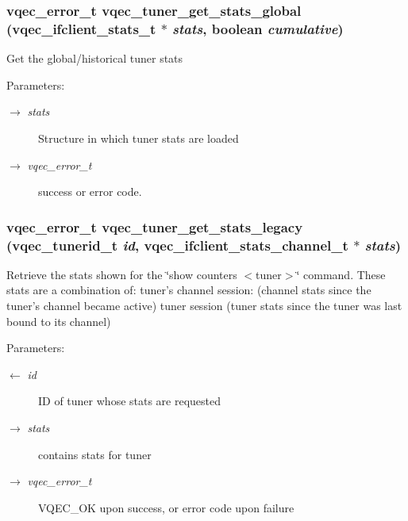 \subsubsection{\setlength{\rightskip}{0pt plus 5cm}vqec\_\-error\_\-t vqec\_\-tuner\_\-get\_\-stats\_\-global (\bf{vqec\_\-ifclient\_\-stats\_\-t} $\ast$ {\em stats}, boolean {\em cumulative})}\label{vqec__tuner_8c_8c7bede0f83da6759d2cf511c4d389fd}


Get the global/historical tuner stats

\begin{Desc}
\item[Parameters:]
\begin{description}
\item[\mbox{$\rightarrow$} {\em stats}]Structure in which tuner stats are loaded \item[\mbox{$\rightarrow$} {\em vqec\_\-error\_\-t}]success or error code. \end{description}
\end{Desc}
\subsubsection{\setlength{\rightskip}{0pt plus 5cm}vqec\_\-error\_\-t vqec\_\-tuner\_\-get\_\-stats\_\-legacy (vqec\_\-tunerid\_\-t {\em id}, \bf{vqec\_\-ifclient\_\-stats\_\-channel\_\-t} $\ast$ {\em stats})}\label{vqec__tuner_8c_8fe484fd125c9568d295a962356e6d08}


Retrieve the stats shown for the \char`\"{}show counters $<$tuner$>$\char`\"{} command. These stats are a combination of: tuner's channel session: (channel stats since the tuner's channel became active) tuner session (tuner stats since the tuner was last bound to its channel)

\begin{Desc}
\item[Parameters:]
\begin{description}
\item[\mbox{$\leftarrow$} {\em id}]ID of tuner whose stats are requested \item[\mbox{$\rightarrow$} {\em stats}]contains stats for tuner \item[\mbox{$\rightarrow$} {\em vqec\_\-error\_\-t}]VQEC\_\-OK upon success, or error code upon failure \end{description}
\end{Desc}
